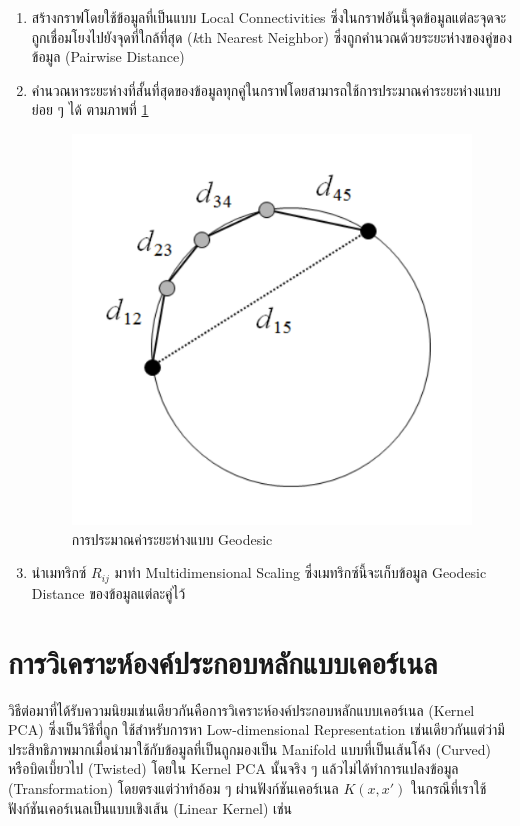 \begin{enumerate}
    \item สร้างกราฟโดยใช้ข้อมูลที่เป็นแบบ Local Connectivities ซึ่งในกราฟอันนี้จุดข้อมูลแต่ละจุดจะถูกเชื่อมโยงไปยังจุดที่ใกล้ที่สุด 
    (\textit{k}th Nearest Neighbor) ซึ่งถูกคำนวณด้วยระยะห่างของคู่ของข้อมูล (Pairwise Distance)

    \item คำนวณหาระยะห่างที่สั้นที่สุดของข้อมูลทุกคู่ในกราฟโดยสามารถใช้การประมาณค่าระยะห่างแบบย่อย ๆ ได้ ตามภาพที่ 
    \ref{fig:approx_geodesic}
    
    \begin{figure}[H]
        \centering
        \includegraphics[width=0.5\linewidth]{fig/approx_geodesic.png}
        \caption{การประมาณค่าระยะห่างแบบ Geodesic}
        \label{fig:approx_geodesic}
    \end{figure}
    
    \item นำเมทริกซ์ $R_{ij}$ มาทำ Multidimensional Scaling ซึ่งเมทริกซ์นี้จะเก็บข้อมูล Geodesic Distance ของข้อมูลแต่ละคู่ไว้
\end{enumerate}

\section{การวิเคราะห์องค์ประกอบหลักแบบเคอร์เนล}
\label{sec:kernel_pca}

วิธีต่อมาที่ได้รับความนิยมเช่นเดียวกันคือการวิเคราะห์องค์ประกอบหลักแบบเคอร์เนล (Kernel PCA)\autocite{scholkopf1998} ซึ่งเป็นวิธีที่ถูก%
ใช้สำหรับการหา Low-dimensional Representation เช่นเดียวกันแต่ว่ามีประสิทธิภาพมากเมื่อนำมาใช้กับข้อมูลที่เป็นถูกมองเป็น Manifold 
แบบที่เป็นเส้นโค้ง (Curved) หรือบิดเบี้ยวไป (Twisted) โดยใน Kernel PCA นั้นจริง ๆ แล้วไม่ได้ทำการแปลงข้อมูล (Transformation) 
โดยตรงแต่ว่าทำอ้อม ๆ ผ่านฟังก์ชันเคอร์เนล $K(x,x')$ ในกรณีที่เราใช้ฟังก์ชันเคอร์เนลเป็นแบบเชิงเส้น (Linear Kernel) เช่น 

